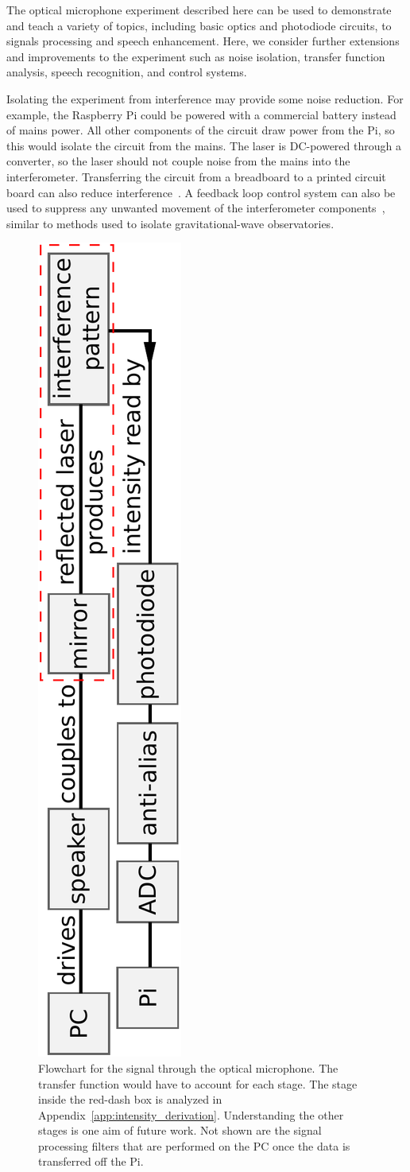 \documentclass[paper-main.tex]{subfiles}
\begin{document}
The optical microphone experiment described here can be used to demonstrate and teach a variety of topics, including basic optics and photodiode circuits, to signals processing and speech enhancement. Here, we consider further extensions and improvements to the experiment such as noise isolation, transfer function analysis, speech recognition, and control systems.



Isolating the experiment from interference may provide some noise reduction. 
For example, the Raspberry Pi could be powered with a commercial battery instead of mains power. 
All other components of the circuit draw power from the Pi, so this would isolate the circuit from the mains. 
The laser is DC-powered through a converter, so the laser should not couple noise from the mains into the interferometer. 
Transferring the circuit from a breadboard to a printed circuit board can also reduce interference~\cite{elfekey2013design}.
A feedback loop control system can also be used to suppress any unwanted movement of the interferometer components~\citep{abbott2017exploring, Sekiguchi:2016bmv, verhoeven2009robust}, similar to methods used to isolate gravitational-wave observatories. 



\begin{figure}
	\includegraphics[height=.8\textwidth, angle=-90]{figures/pipeline.pdf}
	\caption{
Flowchart for the signal through the optical microphone. The transfer function would have to account for each stage. 
The stage inside the red-dash box is analyzed in Appendix~\ref{app:intensity_derivation}. Understanding the other stages is one aim of future work. Not shown are the signal processing filters that are performed on the PC once the data is transferred off the Pi.
}
	\label{fig:pipeline_highlighted}
\end{figure}
\end{document}
